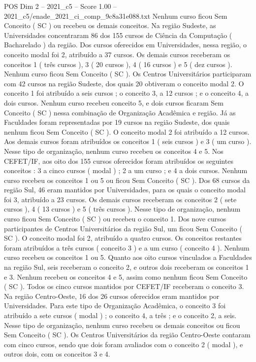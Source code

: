 \begin{textsample}{POS Dim 2 – 2021\_c5 – Score 1.00 – 2021\_c5/enade\_2021\_ci\_comp\_9c8a31e088.txt}
Nenhum curso ficou Sem Conceito ( SC ) ou recebeu os demais conceitos.
Na região Sudeste, as Universidades concentraram 86 dos 155 cursos de Ciência da Computação ( Bacharelado ) da região.
Dos cursos oferecidos em Universidades, nessa região, o conceito modal foi 2, atribuído a 37 cursos.
Os demais cursos receberam os conceitos 1 ( três cursos ), 3 ( 20 cursos ), 4 ( 16 cursos ) e 5 ( dez cursos ).
Nenhum curso ficou Sem Conceito ( SC ).
Os Centros Universitários participaram com 42 cursos na região Sudeste, dos quais 20 obtiveram o conceito modal 2.
O conceito 1 foi atribuído a seis cursos ; o conceito 3, a 12 cursos ; e o conceito 4, a dois cursos.
Nenhum curso recebeu conceito 5, e dois cursos ficaram Sem Conceito ( SC ) nessa combinação de Organização Acadêmica e região.
Já as Faculdades foram representadas por 19 cursos na região Sudeste, dos quais nenhum ficou Sem Conceito ( SC ).
O conceito modal 2 foi atribuído a 12 cursos.
Aos demais cursos foram atribuídos os conceitos 1 ( seis cursos ) e 3 ( um curso ).
Nesse tipo de organização, nenhum curso recebeu os conceitos 4 e 5.
Nos CEFET/IF, aos oito dos 155 cursos oferecidos foram atribuídos os seguintes conceitos : 3 a cinco cursos ( modal ) ; 2 a um curso ; e 4 a dois cursos.
Nenhum curso recebeu os conceitos 1 ou 5 ou ficou Sem Conceito ( SC ).
Dos 68 cursos da região Sul, 46 eram mantidos por Universidades, para os quais o conceito modal foi 3, atribuído a 23 cursos.
Os demais cursos receberam os conceitos 2 ( sete cursos ), 4 ( 13 cursos ) e 5 ( três cursos ).
Nesse tipo de organização, nenhum curso ficou Sem Conceito ( SC ) ou recebeu o conceito 1.
Dos nove cursos participantes de Centros Universitários da região Sul, um ficou Sem Conceito ( SC ).
O conceito modal foi 2, atribuído a quatro cursos.
Os conceitos restantes foram atribuídos a três cursos ( conceito 3 ) e a um curso ( conceito 4 ).
Nenhum curso recebeu os conceitos 1 ou 5.
Quanto aos oito cursos vinculados a Faculdades na região Sul, seis receberam o conceito 2, e outros dois receberam os conceitos 1 e 3.
Nenhum recebeu os conceitos 4 e 5, assim como nenhum ficou Sem Conceito ( SC ).
Todos os cinco cursos mantidos por CEFET/IF receberam o conceito 3.
Na região Centro-Oeste, 16 dos 26 cursos oferecidos eram mantidos por Universidades.
Para este tipo de Organização Acadêmica, o conceito 3 foi atribuído a sete cursos ( modal ) ; o conceito 4, a três ; e o conceito 2, a seis.
Nesse tipo de organização, nenhum curso recebeu os demais conceitos ou ficou Sem Conceito ( SC ).
Os Centros Universitários da região Centro-Oeste contaram com cinco cursos, sendo que dois foram avaliados com o conceito 2 ( modal ), e outros dois, com os conceitos 3 e 4.

\end{textsample}
